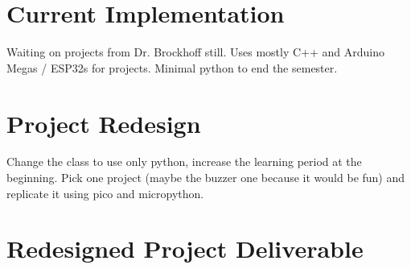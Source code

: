 \section{Current Implementation}
Waiting on projects from Dr. Brockhoff still. Uses mostly C++ and 
Arduino Megas / ESP32s for projects. Minimal python to end the 
semester. 

\section{Project Redesign}
Change the class to use only python, increase the learning period 
at the beginning. Pick one project (maybe the buzzer one because it 
would be fun) and replicate it using pico and micropython.

\section{Redesigned Project Deliverable}
